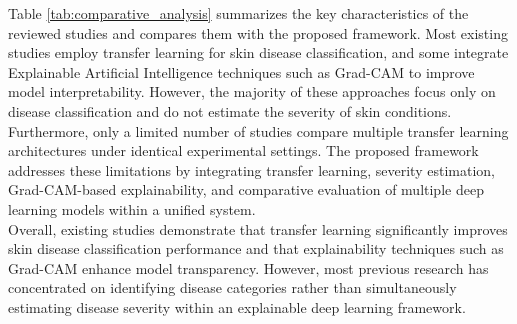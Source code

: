 Table \ref{tab:comparative_analysis} summarizes the key characteristics of the reviewed studies and compares them with the proposed framework. Most existing studies employ transfer learning for skin disease classification, and some integrate Explainable Artificial Intelligence techniques such as Grad-CAM to improve model interpretability. However, the majority of these approaches focus only on disease classification and do not estimate the severity of skin conditions. Furthermore, only a limited number of studies compare multiple transfer learning architectures under identical experimental settings. The proposed framework addresses these limitations by integrating transfer learning, severity estimation, Grad-CAM-based explainability, and comparative evaluation of multiple deep learning models within a unified system.\\
Overall, existing studies demonstrate that transfer learning significantly improves skin disease classification performance and that explainability techniques such as Grad-CAM enhance model transparency. However, most previous research has concentrated on identifying disease categories rather than simultaneously estimating disease severity within an explainable deep learning framework.

